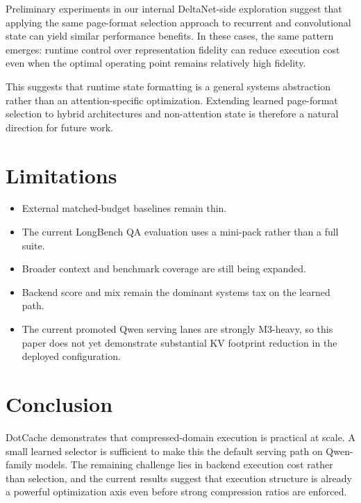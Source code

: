 \documentclass[11pt]{article}
\begin{document}
Preliminary experiments in our internal DeltaNet-side exploration suggest that applying the same page-format selection approach to recurrent and convolutional state can yield similar performance benefits. In these cases, the same pattern emerges: runtime control over representation fidelity can reduce execution cost even when the optimal operating point remains relatively high fidelity.

This suggests that runtime state formatting is a general systems abstraction rather than an attention-specific optimization. Extending learned page-format selection to hybrid architectures and non-attention state is therefore a natural direction for future work.

\FloatBarrier

\section{Limitations}

\begin{itemize}[leftmargin=1.5em]
\item External matched-budget baselines remain thin.
\item The current LongBench QA evaluation uses a mini-pack rather than a full suite.
\item Broader context and benchmark coverage are still being expanded.
\item Backend score and mix remain the dominant systems tax on the learned path.
\item The current promoted Qwen serving lanes are strongly M3-heavy, so this paper does not yet demonstrate substantial KV footprint reduction in the deployed configuration.
\end{itemize}

\section{Conclusion}

DotCache demonstrates that compressed-domain execution is practical at scale. A small learned selector is sufficient to make this the default serving path on Qwen-family models. The remaining challenge lies in backend execution cost rather than selection, and the current results suggest that execution structure is already a powerful optimization axis even before strong compression ratios are enforced.
\end{document}

